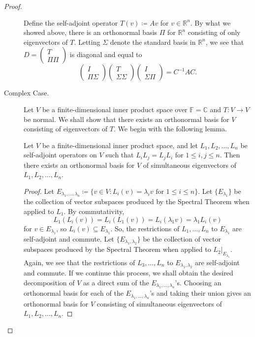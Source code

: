 \documentclass{article}
\begin{document}
\begin{proof}
\begin{description}
			Define the self-adjoint operator \(T(v) \coloneqq Av\) for \(v\in
			\mathbb{R}^n\).  By what we showed above, there is an orthonormal basis
			\(\Pi\) for \(\mathbb{R}^n\) consisting of only eigenvectors of
			\(T\). Letting \(\Sigma\) denote the standard basis in \(\mathbb{R}^n\),
			we see that \(D = \begin{pmatrix} T \\ \Pi \Pi \end{pmatrix}\) is
			diagonal and equal to
			\[
				\begin{pmatrix} I \\ \Pi \Sigma \end{pmatrix} \begin{pmatrix} T \\
					\Sigma \Sigma\end{pmatrix} \begin{pmatrix} I \\ \Sigma \Pi
				\end{pmatrix} = C^{-1} A C
				.\]
		\item[Complex Case.]  Let \(V\) be a finite-dimensional inner product space
			over \(\mathbb{F} = \mathbb{C}\) and \(T:V\to V\) be normal.  We shall
			show that there exists an orthonormal basis for \(V\) consisting of
			eigenvectors of \(T\).  We begin with the following lemma.
			\begin{lemma}\label{lem:simul_spectral}
				Let \(V\) be a finite-dimensional inner product space, and let \(L_1,
				L_2, \ldots, L_n\) be self-adjoint operators on \(V\) such that \(L_i
				L_j = L_j L_i\) for \(1\leq i, j\leq n\).  Then there exists an
				orthonormal basis for \(V\) of simultaneous eigenvectors of \(L_1, L_2,
				\ldots, L_n\).
			\end{lemma}
			\begin{proof}
				Let \(E_{\lambda_1, \ldots, \lambda_n} \coloneqq \{v\in V : L_i(v) =
				\lambda_i v \text{ for } 1\leq i\leq n\}\).  Let \(\{E_{\lambda_1}\}\)
				be the collection of vector subspaces produced by the Spectral Theorem
				when applied to \(L_1\).  By commutativity,
				\[
					L_1(L_i(v)) = L_i(L_1(v)) = L_i(\lambda_1 v) = \lambda_1 L_i(v)
				\]
				for \(v\in E_{\lambda_1}\), so \(L_i(v)\subseteq E_{\lambda_1}\).  So,
				the restrictions of \(L_1, \ldots, L_n\) to \(E_{\lambda_1}\) are
				self-adjoint and commute. Let \(\{E_{\lambda_1, \lambda_2}\}\) be the
				collection of vector subspaces produced by the Spectral Theorem when
				applied to \(L_2|_{E_{\lambda_1}}\). Again, we see that the
				restrictions of \(L_3, \ldots, L_n\) to \(E_{\lambda_1, \lambda_2}\)
				are self-adjoint and commute.  If we continue this process, we shall
				obtain the desired decomposition of \(V\) as a direct sum of the
				\(E_{\lambda_1,\ldots, \lambda_n}\)'s.  Choosing an orthonormal basis
				for each of the \(E_{\lambda_1,\ldots, \lambda_n}\)'s and taking their
				union gives an orthonormal basis for \(V\) consisting of simultaneous eigenvectors
				of \(L_1, L_2, \ldots, L_n\).
			\end{proof}


\end{description}
\end{proof}
\end{document}
